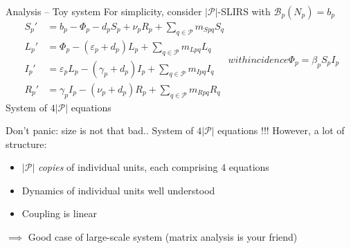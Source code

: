 \documentclass[aspectratio=169]{beamer}\usepackage[]{graphicx}\usepackage[]{xcolor}
\begin{document}

\begin{frame}{Analysis -- Toy system}
For simplicity, consider $|\mathcal{P}|$-SLIRS with $\mathcal{B}_p(N_p)=b_p$
\begin{subequations}
	\label{sys:pSLIRS_toy}
	\begin{align}
		S_{p}' &=b_p-\Phi_p-d_pS_p+\nu_pR_p
		+\textstyle{\sum_{q\in\mathcal{P}}} m_{Spq}S_{q} 
		\label{sys:pSLIRS_toy_dS} \\
		L_{p}' &=\Phi_p-\left( \varepsilon_{p}+d_{p}\right)L_{p}
		+\textstyle{\sum_{q\in\mathcal{P}}} m_{Lpq}L_{q} 
		\label{sys:pSLIRS_toy_dL} \\
		I_{p}' &=\varepsilon_pL_p-(\gamma_p+d_p)I_p
		+\textstyle{\sum_{q\in\mathcal{P}}} m_{Ipq}I_{q} 
		\label{sys:pSLIRS_toy_dI} \\
		R_{p}' &=\gamma _{p}I_{p}-\left(\nu_{p}+d_{p}\right)R_{p}
		+\textstyle{\sum_{q\in\mathcal{P}}} m_{Rpq}R_{q}
		\label{sys:pSLIRS_toy_dR} 
	\end{align}
	with incidence
	\begin{equation}
		\Phi_p=\beta_pS_pI_p
		\label{sys:pSLIRS_toy_incidence} 
	\end{equation}			
\end{subequations}
\vfill
System of $4|\mathcal{P}|$ equations
\end{frame}

\begin{frame}{Don't panic: size is not that bad..}
System of $4|\mathcal{P}|$ equations !!!
\vfill
However, a lot of structure: 
\begin{itemize}
	\item $|\mathcal{P}|$ \emph{copies} of individual units, each comprising 4 equations
	\item Dynamics of individual units well understood
	\item Coupling is linear
\end{itemize}
\vfill
$\implies$ Good case of large-scale system
\vfill
(matrix analysis is your friend)

\end{frame}
\end{document}
